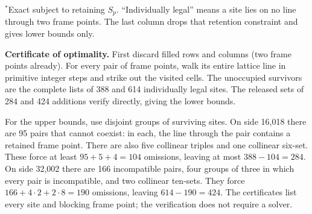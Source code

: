 {\footnotesize $^{*}$Exact subject to retaining $S_p$. ``Individually legal'' means a site lies on no line through two frame points. The last column drops that retention constraint and gives lower bounds only.}\par
\textbf{Certificate of optimality.} First discard filled rows and columns (two frame points already). For every pair of frame points, walk its entire lattice line in primitive integer steps and strike out the visited cells. The unoccupied survivors are the complete lists of 388 and 614 individually legal sites. The released sets of 284 and 424 additions verify directly, giving the lower bounds.

For the upper bounds, use disjoint groups of surviving sites. On side 16,018 there are 95 pairs that cannot coexist: in each, the line through the pair contains a retained frame point. There are also five collinear triples and one collinear six-set. These force at least $95+5+4=104$ omissions, leaving at most $388-104=284$. On side 32,002 there are 166 incompatible pairs, four groups of three in which every pair is incompatible, and two collinear ten-sets. They force $166+4\cdot2+2\cdot8=190$ omissions, leaving $614-190=424$. The certificates list every site and blocking frame point; the verification does not require a solver.
